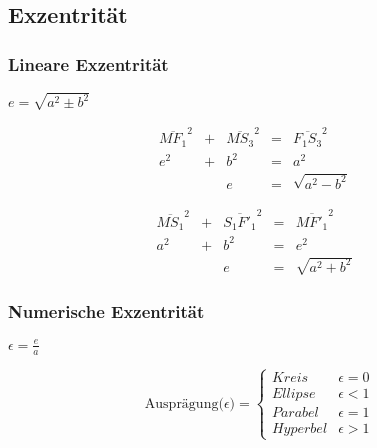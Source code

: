 \subsection{Exzentrität}
\begin{frame}
\frametitle{Lineare Exzentrität}
\begin{definition}
	$e = \sqrt{a^2\pm b^2}$
\end{definition}
\end{frame}

\begin{frame}
\begin{figure}[h]
	\centering
		\resizebox{.5\linewidth}{!}{
			
		}
\end{figure}
\begin{displaymath}
	\begin{array}{ccccll}
		\overline{M{F}_1}^2 & + & \overline{M{S}_3}^2 & = & \overline{{F}_1{S}_3}^2 &\\
		e^2 & + & b^2 & = & a^2 &\\
		&& e & = & \sqrt{a^2-b^2}
	\end{array}
\end{displaymath}
\end{frame}

\begin{frame}
\begin{figure}[h]
	\centering
		\resizebox{.5\linewidth}{!}{
			
		}
\end{figure}
\begin{displaymath}
	\begin{array}{ccccll}
		\overline{M{S}_1}^2 & + & \overline{{S}_1{F'}_1}^2 & = & \overline{M{F'}_1}^2 &\\
		a^2 & + & b^2 & = & e^2 &\\
		&& e & = & \sqrt{a^2+b^2}
	\end{array}
\end{displaymath}
\end{frame}

\begin{frame}
\frametitle{Numerische Exzentrität}
\begin{definition}
	$\epsilon = \frac{e}{a}$
\end{definition}
\end{frame}

\begin{frame}
\begin{displaymath}
   \text{Ausprägung($\epsilon$)} = \left\{
     \begin{array}{lr}
       Kreis & \epsilon = 0 \\
       Ellipse & \epsilon < 1\\
       Parabel & \epsilon = 1\\
       Hyperbel & \epsilon > 1
     \end{array}
   \right.
\end{displaymath}
\end{frame}

